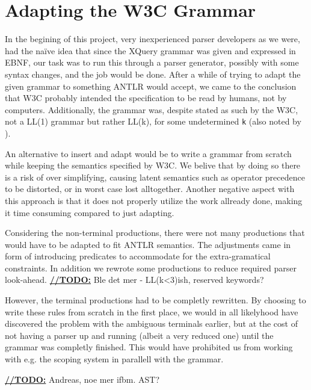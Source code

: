 \section{Adapting the W3C Grammar}
\label{sect:discussion:adaptW3C}

In the begining of this project, very inexperienced parser developers as we
were, had the na\"{i}ve idea that since the XQuery grammar was given and
expressed in EBNF, our task was to run this through a parser generator,
possibly with some syntax changes, and the job would be done. After a while of
trying to adapt the given grammar to something ANTLR would accept, we came to
the conclusion that W3C probably intended the specification to be read by
humans, not by computers. Additionally, the grammar was, despite stated as such
by the W3C, not a LL(1) grammar but rather LL(k), for some undetermined \verb!k!
(also noted by \cite{kang_xquery_diglib}).

An alternative to insert and adapt would be to write a grammar from scratch while keeping the semantics specified by W3C. We belive that by doing so there is a risk of over simplifying, causing latent semantics such as operator precedence to be distorted, or in worst case lost alltogether. Another negative aspect with this approach is that it does not properly utilize the work allready done, making it time consuming compared to just adapting.

Considering the non-terminal productions, there were not many productions that would have to be adapted to fit ANTLR semantics. The adjustments came in form of introducing predicates to accommodate for the extra-gramatical constraints. In addition we rewrote some productions to reduce required parser look-ahead. \underline{\textbf{\LARGE //TODO:}} Ble det mer - LL(k<3)ish, reserved keywords?

However, the terminal productions had to be completly rewritten. By choosing to write these rules from scratch in the first place, we would in all likelyhood have discovered the problem with the ambiguous terminals earlier, but at the cost of not having a parser up and running (albeit a very reduced one) until the grammar was completly finished. This would have prohibited us from working with e.g. the scoping system in parallell with the grammar.

\underline{\textbf{\LARGE //TODO:}} Andreas, noe mer ifbm. AST?